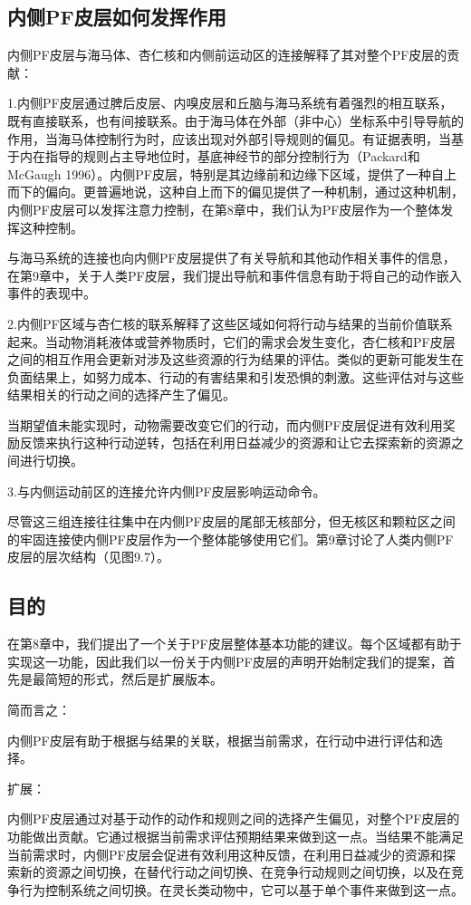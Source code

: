 \subsection{内侧PF皮层如何发挥作用}
内侧PF皮层与海马体、杏仁核和内侧前运动区的连接解释了其对整个PF皮层的贡献：\par
1.内侧PF皮层通过脾后皮层、内嗅皮层和丘脑与海马系统有着强烈的相互联系，既有直接联系，也有间接联系。由于海马体在外部（非中心）坐标系中引导导航的作用，当海马体控制行为时，应该出现对外部引导规则的偏见。有证据表明，当基于内在指导的规则占主导地位时，基底神经节的部分控制行为（Packard和McGaugh 1996）。内侧PF皮层，特别是其边缘前和边缘下区域，提供了一种自上而下的偏向。更普遍地说，这种自上而下的偏见提供了一种机制，通过这种机制，内侧PF皮层可以发挥注意力控制，在第8章中，我们认为PF皮层作为一个整体发挥这种控制。\par
与海马系统的连接也向内侧PF皮层提供了有关导航和其他动作相关事件的信息，在第9章中，关于人类PF皮层，我们提出导航和事件信息有助于将自己的动作嵌入事件的表现中。\par
2.内侧PF区域与杏仁核的联系解释了这些区域如何将行动与结果的当前价值联系起来。当动物消耗液体或营养物质时，它们的需求会发生变化，杏仁核和PF皮层之间的相互作用会更新对涉及这些资源的行为结果的评估。类似的更新可能发生在负面结果上，如努力成本、行动的有害结果和引发恐惧的刺激。这些评估对与这些结果相关的行动之间的选择产生了偏见。\par
当期望值未能实现时，动物需要改变它们的行动，而内侧PF皮层促进有效利用奖励反馈来执行这种行动逆转，包括在利用日益减少的资源和让它去探索新的资源之间进行切换。\par
3.与内侧运动前区的连接允许内侧PF皮层影响运动命令。\par
尽管这三组连接往往集中在内侧PF皮层的尾部无核部分，但无核区和颗粒区之间的牢固连接使内侧PF皮层作为一个整体能够使用它们。第9章讨论了人类内侧PF皮层的层次结构（见图9.7）。\par
\subsection{目的}
在第8章中，我们提出了一个关于PF皮层整体基本功能的建议。每个区域都有助于实现这一功能，因此我们以一份关于内侧PF皮层的声明开始制定我们的提案，首先是最简短的形式，然后是扩展版本。\par
简而言之：\par
内侧PF皮层有助于根据与结果的关联，根据当前需求，在行动中进行评估和选择。\par
扩展：\par
内侧PF皮层通过对基于动作的动作和规则之间的选择产生偏见，对整个PF皮层的功能做出贡献。它通过根据当前需求评估预期结果来做到这一点。当结果不能满足当前需求时，内侧PF皮层会促进有效利用这种反馈，在利用日益减少的资源和探索新的资源之间切换，在替代行动之间切换、在竞争行动规则之间切换，以及在竞争行为控制系统之间切换。在灵长类动物中，它可以基于单个事件来做到这一点。\par

